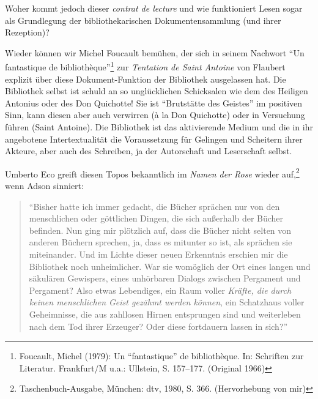 Woher kommt jedoch dieser \emph{contrat de lecture} und wie funktioniert
Lesen sogar als Grundlegung der bibliothekarischen Dokumentensammlung
(und ihrer Rezeption)?

Wieder können wir Michel Foucault bemühen, der sich in seinem Nachwort
\enquote{Un fantastique de bibliothèque}\footnote{Foucault, Michel
  (1979): Un \enquote{fantastique} de bibliothèque. In: Schriften zur
  Literatur. Frankfurt/M u.a.: Ullstein, S. 157--177. (Original 1966)}
zur \emph{Tentation de Saint Antoine} von Flaubert explizit über diese
Dokument-Funktion der Bibliothek ausgelassen hat. Die Bibliothek selbst
ist schuld an so unglücklichen Schicksalen wie dem des Heiligen Antonius
oder des Don Quichotte! Sie ist \enquote{Brutstätte des Geistes} im
positiven Sinn, kann diesen aber auch verwirren (à la Don Quichotte)
oder in Versuchung führen (Saint Antoine). Die Bibliothek ist das
aktivierende Medium und die in ihr angebotene Intertextualität die
Voraussetzung für Gelingen und Scheitern ihrer Akteure, aber auch des
Schreiben, ja der Autorschaft und Leserschaft selbst.

Umberto Eco greift diesen Topos bekanntlich im \emph{Namen der Rose}
wieder auf,\footnote{Taschenbuch-Ausgabe, München: dtv, 1980, S. 366.
  (Hervorhebung von mir)} wenn Adson sinniert:

\begin{quote}
\enquote{Bisher hatte ich immer gedacht, die Bücher sprächen nur von den
menschlichen oder göttlichen Dingen, die sich außerhalb der Bücher
befinden. Nun ging mir plötzlich auf, dass die Bücher nicht selten von
anderen Büchern sprechen, ja, dass es mitunter so ist, als sprächen sie
miteinander. Und im Lichte dieser neuen Erkenntnis erschien mir die
Bibliothek noch unheimlicher. War sie womöglich der Ort eines langen und
säkulären Gewispers, eines unhörbaren Dialogs zwischen Pergament und
Pergament? Also etwas Lebendiges, ein Raum voller \emph{Kräfte, die
durch keinen menschlichen Geist gezähmt werden können}, ein Schatzhaus
voller Geheimnisse, die aus zahllosen Hirnen entsprungen sind und
weiterleben nach dem Tod ihrer Erzeuger? Oder diese fortdauern lassen in
sich?}
\end{quote}

